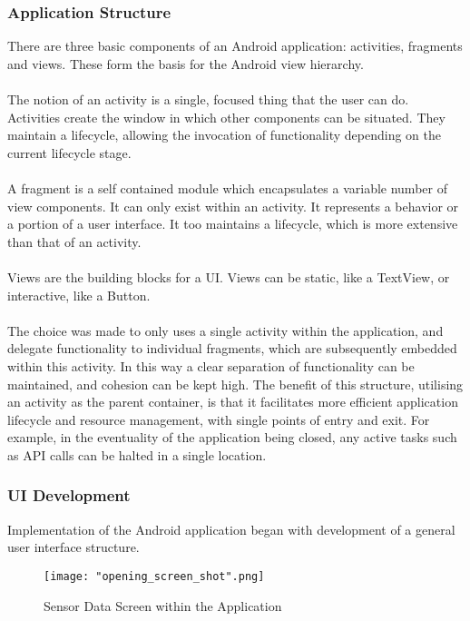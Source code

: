 \documentclass{article}
\begin{document}
\subsubsection{Application Structure}
There are three basic components of an Android application: activities, fragments and views. These form the basis for the Android view hierarchy. \\\\
The notion of an activity is a single, focused thing that the user can do. Activities create the window in which other components can be situated. They maintain a lifecycle, allowing the invocation of functionality depending on the current lifecycle stage. \\\\
A fragment is a self contained module which encapsulates a variable number of view components. It can only exist within an activity. It represents a behavior or a portion of a user interface. It too maintains a lifecycle, which is more extensive than that of an activity.\\\\
Views are the building blocks for a UI. Views can be static, like a TextView, or interactive, like a Button. \\\\
The choice was made to only uses a single activity within the application, and delegate functionality to individual fragments, which are subsequently embedded within this activity. In this way a clear separation of functionality can be maintained, and cohesion can be kept high. The benefit of this structure, utilising an activity as the parent container, is that it facilitates more efficient application lifecycle and resource management, with single points of entry and exit. For example, in the eventuality of the application being closed, any active tasks such as API calls can be halted in a single location. 

\subsubsection{UI Development}
Implementation of the Android application began with development of a general user interface structure.

\begin{figure}[H]
\centering
\texttt{[image: "opening\_screen\_shot".png]}
\caption{Sensor Data Screen within the Application}
\label{fig:android_opening_screen}
\end{figure}
\end{document}
